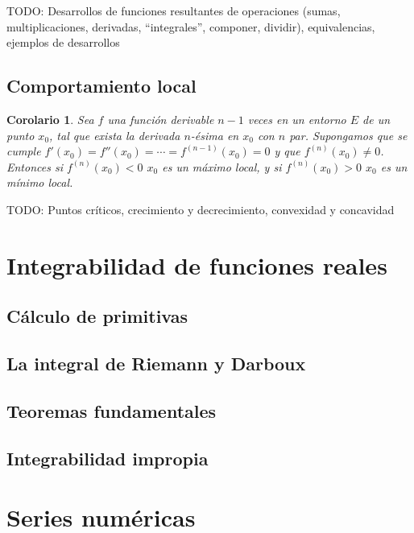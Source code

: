 \documentclass{article}
\newtheorem{cor}{Corolario}
\begin{document}
TODO: Desarrollos de funciones resultantes de operaciones (sumas, multiplicaciones, derivadas, ``integrales'', componer, dividir), equivalencias, ejemplos de desarrollos

\subsection{Comportamiento local}

\begin{cor}
	Sea $f$ una función derivable $n-1$ veces en un entorno $E$ de un punto $x_0$, tal que exista la derivada $n$-ésima en $x_0$ con $n$ par. Supongamos que se cumple $f'(x_0) = f''(x_0) = \cdots = f^{(n-1)}(x_0) = 0$ y que $f^{(n)}(x_0) \neq 0$. Entonces si $f^{(n)}(x_0) < 0$ $x_0$ es un máximo local, y si $f^{(n)}(x_0) > 0$ $x_0$ es un mínimo local.
\end{cor}

TODO: Puntos críticos, crecimiento y decrecimiento, convexidad y concavidad










\newpage
\section{Integrabilidad de funciones reales}

\subsection{Cálculo de primitivas}

\subsection{La integral de Riemann y Darboux}

\subsection{Teoremas fundamentales}

\subsection{Integrabilidad impropia}





\section{Series numéricas}
\end{document}
